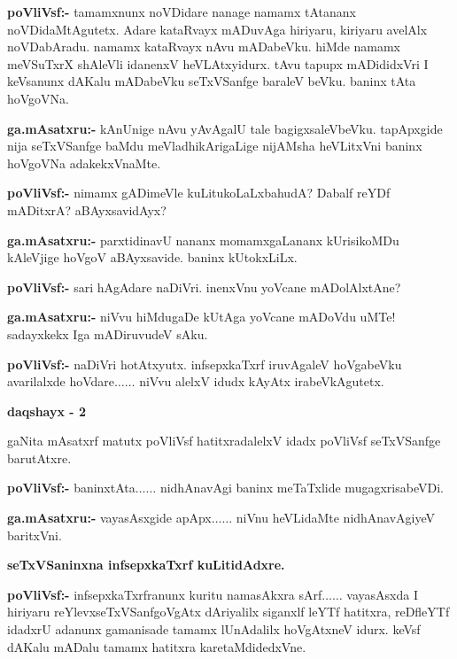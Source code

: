 \smallskip
\noindent
\textbf{poVliVsf:-} tamamxnunx noVDidare nanage namamx tAtananx noVDidaMtAgutetx. Adare kataRvayx mADuvAga hiriyaru, kiriyaru avelAlx noVDabAradu. namamx kataRvayx nAvu mADabeVku. hiMde namamx meVSuTxrX shAleVli idanenxV heVLAtxyidurx. tAvu tapupx mADididxVri I keVsanunx dAKalu mADabeVku seTxVSanfge baraleV beVku. baninx tAta hoVgoVNa.

\smallskip
\noindent
\textbf{ga.mAsatxru:-} kAnUnige nAvu yAvAgalU tale bagigxsaleVbeVku. tapApxgide nija seTxVSanfge baMdu meVladhikArigaLige nijAMsha heVLitxVni baninx hoVgoVNa adakekxVnaMte.

\smallskip
\noindent
\textbf{poVliVsf:-} nimamx gADimeVle kuLitukoLaLxbahudA? Dabalf reYDf mADitxrA? aBAyxsavidAyx?

\smallskip
\noindent
\textbf{ga.mAsatxru:-} parxtidinavU nananx momamxgaLananx kUrisikoMDu kAleVjige hoVgoV aBAyxsavide. baninx kUtokxLiLx.

\smallskip
\noindent
\textbf{poVliVsf:-} sari hAgAdare naDiVri. inenxVnu yoVcane mADolAlxtAne?

\smallskip
\noindent
\textbf{ga.mAsatxru:-} niVvu hiMdugaDe kUtAga yoVcane mADoVdu uMTe! sadayxkekx Iga mADiruvudeV sAku.

\smallskip
\noindent
\textbf{poVliVsf:-} naDiVri hotAtxyutx. infsepxkaTxrf iruvAgaleV hoVgabeVku avarilalxde hoVdare$\ldots\ldots$ niVvu alelxV idudx kAyAtx irabeVkAgutetx.

\begin{center}
{\bf daqshayx - {\rm 2}}
\end{center}

gaNita mAsatxrf matutx poVliVsf hatitxradalelxV idadx poVliVsf seTxVSanfge barutAtxre.

\noindent
\textbf{poVliVsf:-} baninxtAta$\ldots\ldots$ nidhAnavAgi baninx meTaTxlide mugagxrisabeVDi.

\smallskip
\noindent
\textbf{ga.mAsatxru:-} vayasAsxgide apApx$\ldots\ldots$ niVnu heVLidaMte nidhAnavAgiyeV baritxVni.

\begin{center}
{\bf seTxVSaninxna infsepxkaTxrf kuLitidAdxre.}
\end{center}

\noindent
\textbf{poVliVsf:-} infsepxkaTxrfranunx kuritu namasAkxra sArf$\ldots\ldots$ vayasAsxda I hiriyaru reYlevxseTxVSanfgoVgAtx dAriyalilx siganxlf leYTf hatitxra, reDfleYTf idadxrU adanunx gamanisade tamamx lUnAdalilx hoVgAtxneV idurx. keVsf dAKalu mADalu tamamx hatitxra karetaMdidedxVne.

